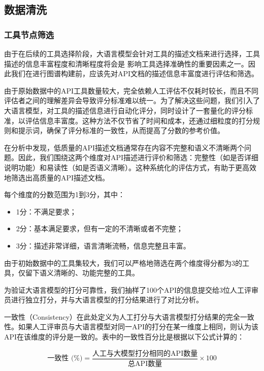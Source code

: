 \subsection{数据清洗}

\subsubsection{工具节点筛选}


由于在后续的工具选择阶段，大语言模型会针对工具的描述文档来进行选择，工具描述的信息丰富程度和清晰程度将会是
影响工具选择准确性的重要因素之一。因此我们在进行图谱构建前，应该先对API文档的描述信息丰富度进行评估和筛选。

由于原始数据中的API工具数量较大，完全依赖人工评估不仅耗时较长，而且不同评估者之间的理解差异会导致评分标准难以统一。为了解决这些问题，我们引入了大语言模型，对工具的描述信息进行自动化评分，同时设计了一套量化的评分标准，以评估信息丰富度。这种方法不仅节省了时间和成本，还通过细粒度的打分规则和提示词，确保了评分标准的一致性，从而提高了分数的参考价值。

在分析中发现，低质量的API描述文档通常存在内容不完整和语义不清晰两个问题。因此，我们围绕这两个维度对API描述进行评价和筛选：完整性（如是否详细说明功能）和易读性（如是否语义清晰）。这种系统化的评估方式，有助于更高效地筛选出高质量的API描述文档。

每个维度的分数范围为1到3分，其中：
\begin{itemize}
    \item 1分：不满足要求；
    \item 2分：基本满足要求，但有一定的不清晰或者不完整；
    \item 3分：描述非常详细，语言清晰流畅，信息完整且丰富。
\end{itemize}

由于初始数据中的工具集较大，我们可以严格地筛选在两个维度得分都为3的工具，仅留下语义清晰的、功能完整的工具。

为验证大语言模型的打分可靠性，我们抽样了100个API的信息提交给3位人工评审员进行独立打分，并与大语言模型的打分结果进行了对比分析。

一致性（Consistency）在此处定义为人工打分与大语言模型打分结果的完全一致性。如果人工评审员与大语言模型对同一API的打分在某一维度上相同，则认为该API在该维度的评分是一致的。表中的一致性百分比是根据以下公式计算的：

\[
\text{一致性 (\%)} = \frac{\text{人工与大模型打分相同的API数量}}{\text{总API数量}} \times 100
\]

